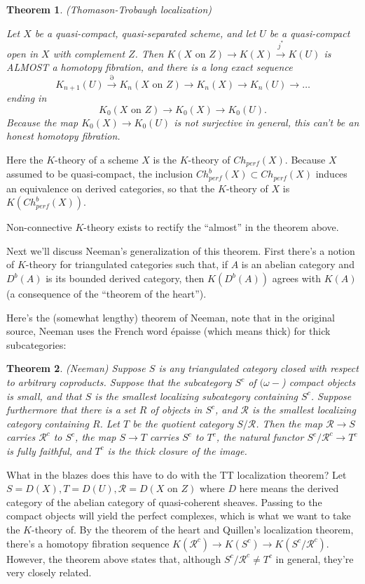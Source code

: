 \documentclass[letterpaper]{article}
\newtheorem{theorem}{Theorem}
\theoremstyle{definition}
\newcommand{\mc}{\mathcal}
\begin{document}
\begin{theorem} (Thomason-Trobaugh localization)

Let $X$ be a quasi-compact, quasi-separated scheme, and let $U$ be a
quasi-compact open in $X$ with complement $Z$. Then $K(X \text{ on }
Z) \rightarrow K(X) \xrightarrow{j^*} K(U)$ is ALMOST a homotopy fibration,
and there is a long exact sequence
\[
K_{n+1}(U) \xrightarrow{\partial} K_n(X \text{ on } Z) \rightarrow
K_n(X) \rightarrow K_n(U) \rightarrow \dots
\]
ending in
\[
K_0(X \text{ on } Z) \rightarrow K_0(X) \rightarrow K_0(U).
\]
Because the map $K_0(X) \rightarrow K_0(U)$ is not surjective in
general, this can't be an honest homotopy fibration. 
\end{theorem}

Here the $K$-theory of a scheme $X$ is the $K$-theory of
$Ch_{perf}(X)$. Because $X$ assumed to be quasi-compact, the inclusion
$Ch^b_{perf}(X) \subset Ch_{perf}(X)$ induces an equivalence on
derived categories, so that the $K$-theory of $X$ is $K(Ch^b_{perf}(X))$.

Non-connective $K$-theory exists to rectify the ``almost'' in the
theorem above. 

Next we'll discuss Neeman's generalization of this theorem. First
there's a notion of $K$-theory for triangulated categories such that,
if $A$ is an abelian category and $D^b(A)$ is its bounded derived
category, then $K(D^b(A))$ agrees with $K(A)$ (a consequence of the ``theorem of the heart'').

Here's the (somewhat lengthy) theorem of Neeman, note that in the
original source, Neeman uses
the French word \'epaisse (which means thick) for thick subcategories:

\begin{theorem} (Neeman)
Suppose $S$ is any triangulated category closed with respect to
arbitrary coproducts. Suppose that the subcategory $S^c$ of
$(\omega-$) compact objects is small, and that $S$ is the smallest
localizing subcategory containing $S^c$. Suppose furthermore that
there is a set $R$ of objects in $S^c$, and $\mc R$ is the smallest
localizing category containing $R$. Let $T$ be the quotient category
$S/\mc R$. Then the map $\mc R \rightarrow S$ carries $\mc R^c$ to
$S^c$, the map $S \rightarrow T$ carries $S^c$ to $T^c$, the natural
functor $S^c/\mc R^c \rightarrow T^c$ is fully faithful, and $T^c$ is
the thick closure of the image.
\end{theorem}

What in the blazes does this have to do with the TT localization
theorem? Let $S = D(X), T = D(U), \mc R = D(X \text{ on } Z)$ where
$D$ here means the derived category of the abelian category of
quasi-coherent sheaves. Passing to the compact objects will yield the
perfect complexes, which is what we want to take the $K$-theory of. By
the theorem of the heart and Quillen's localization theorem, there's a
homotopy fibration sequence $K(\mc R^c)\rightarrow K(S^c) \rightarrow
K(S^c/\mc R^c)$. However, the theorem above states that, although
$S^c/\mc R^c \neq T^c$ in general, they're very closely related.
\end{document}
